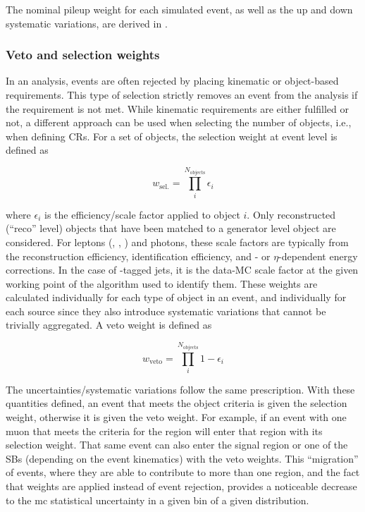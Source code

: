The nominal \gls{pileup} weight for each simulated event, as well as the up and down systematic variations, are derived in \nanoAODtools. %




\subsubsection{Veto and selection weights}
\label{subsubsec:veto_sel_weights}

In an analysis, events are often rejected by placing kinematic or object-based requirements. This type of selection strictly removes an event from the analysis if the requirement is not met. While kinematic requirements are either fulfilled or not, a different approach can be used when selecting the number of objects, i.e., when defining \glspl{CR}. For a set of objects, the selection weight at event level is defined as

\begin{equation}
    w_{\mathrm{sel.}} = \prod_i^{N_\mathrm{objects}} \epsilon_i
    \label{eq:event_selection_weight}
\end{equation}

where $\epsilon_i$ is the efficiency/scale factor applied to object $i$. Only reconstructed (``reco'' level) objects that have been matched to a generator level object are considered. For leptons (\Pe, \Pmu, \Ptau) and photons, these scale factors are typically from the reconstruction efficiency, identification efficiency, and \pt- or $\eta$-dependent energy corrections. In the case of \Pqb-tagged jets, it is the data-MC scale factor at the given working point of the algorithm used to identify them. These weights are calculated individually for each type of object in an event, and individually for each source since they also introduce systematic variations that cannot be trivially aggregated. A veto weight is defined as

\begin{equation}
    w_{\mathrm{veto}} = \prod_i^{N_\mathrm{objects}} 1 - \epsilon_i
    \label{eq:event_veto_weight}
\end{equation}

The uncertainties/systematic variations follow the same prescription. With these quantities defined, an event that meets the object criteria is given the selection weight, otherwise it is given the veto weight. For example, if an event with one muon that meets the criteria for the \singleMuCr region will enter that region with its selection weight. That same event can also enter the signal region or one of the \glspl{SB} (depending on the event kinematics) with the veto weights. This ``migration'' of events, where they are able to contribute to more than one region, and the fact that weights are applied instead of event rejection, provides a noticeable decrease to the \acrlong{mc} statistical uncertainty in a given bin of a given distribution.

